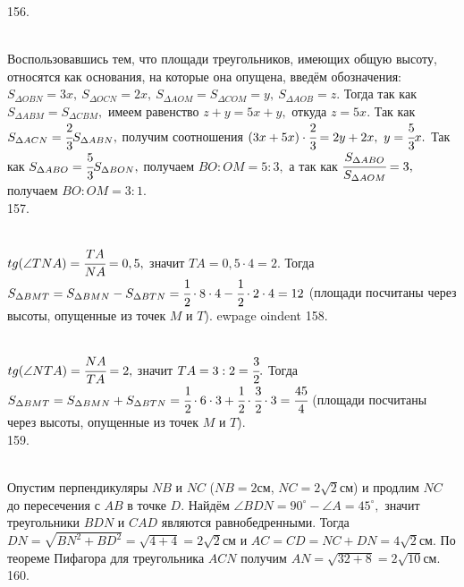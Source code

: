 156. \begin{figure}[ht!]
\end{figure}\\
Воспользовавшись тем, что площади треугольников, имеющих общую высоту, относятся как основания, на которые она опущена, введём обозначения: $S_{\Delta OBN}=3x,\ S_{\Delta OCN}=2x,\ S_{\Delta AOM}=S_{\Delta COM}=y,\ S_{\Delta AOB}=z.$ Тогда так как $S_{\Delta ABM}=S_{\Delta CBM},$ имеем равенство $z+y=5x+y,$ откуда $z=5x.$ Так как $S_{\Delta ACN}=\cfrac{2}{3}S_{\Delta ABN},$ получим соотношения $(3x+5x)\cdot\cfrac{2}{3}=2y+2x,\ y=\cfrac{5}{3}x.$ Так как $S_{\Delta ABO}=\cfrac{5}{3}S_{\Delta BON},$ получаем $BO:OM=5:3,$ а так как $\cfrac{S_{\Delta ABO}}{S_{\Delta AOM}}=3,$ получаем $BO:OM=3:1.$\\
157. \begin{figure}[ht!]
\end{figure}\\
$tg(\angle TNA)=\cfrac{TA}{NA}=0,5,$ значит $TA=0,5\cdot4=2.$ Тогда $S_{\Delta BMT}=S_{\Delta BMN}-S_{\Delta BTN}=\cfrac{1}{2}\cdot8\cdot4-\cfrac{1}{2}\cdot2\cdot4=12$ (площади посчитаны через высоты, опущенные из точек $M$ и $T$).
ewpage
oindent
158. \begin{figure}[ht!]
\end{figure}\\
$tg(\angle NTA)=\cfrac{NA}{TA}=2,$ значит $TA=3:2=\cfrac{3}{2}.$ Тогда $S_{\Delta BMT}=S_{\Delta BMN}+S_{\Delta BTN}=\cfrac{1}{2}\cdot6\cdot3+\cfrac{1}{2}\cdot\cfrac{3}{2}\cdot3=\cfrac{45}{4}$ (площади посчитаны через высоты, опущенные из точек $M$ и $T$).\\
159. \begin{figure}[ht!]
\end{figure}\\
Опустим перпендикуляры $NB$ и $NC$ ($NB=2$см, $NC=2\sqrt{2}$см) и продлим $NC$ до пересечения с $AB$ в точке $D.$ Найдём $\angle BDN=90^\circ-\angle A=45^\circ,$ значит треугольники $BDN$ и $CAD$ являются равнобедренными. Тогда $DN=\sqrt{BN^2+BD^2}=\sqrt{4+4}=2\sqrt{2}$см и $AC=CD=NC+DN=4\sqrt{2}$см. По теореме Пифагора для треугольника $ACN$ получим $AN=\sqrt{32+8}=2\sqrt{10}$см.\\
160. \begin{figure}[ht!]
\end{figure}\\
